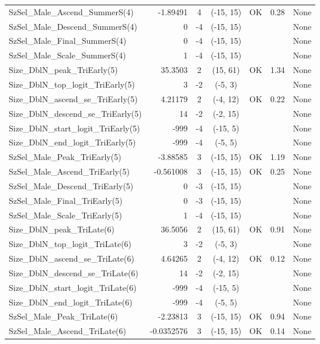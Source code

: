 \documentclass[12pt,]{article}
\begin{document}
\begin{landscape}
\begin{longtable}{lrcccll}
  SzSel\_Male\_Ascend\_SummerS(4) & -1.89491 & 4 & (-15, 15) & OK & 0.28 & None \\ 
  SzSel\_Male\_Descend\_SummerS(4) & 0 & -4 & (-15, 15) &  &  & None \\ 
  SzSel\_Male\_Final\_SummerS(4) & 0 & -4 & (-15, 15) &  &  & None \\ 
  SzSel\_Male\_Scale\_SummerS(4) & 1 & -4 & (-15, 15) &  &  & None \\ 
  Size\_DblN\_peak\_TriEarly(5) & 35.3503 & 2 & (15, 61) & OK & 1.34 & None \\ 
  Size\_DblN\_top\_logit\_TriEarly(5) & 3 & -2 & (-5, 3) &  &  & None \\ 
  Size\_DblN\_ascend\_se\_TriEarly(5) & 4.21179 & 2 & (-4, 12) & OK & 0.22 & None \\ 
  Size\_DblN\_descend\_se\_TriEarly(5) & 14 & -2 & (-2, 15) &  &  & None \\ 
  Size\_DblN\_start\_logit\_TriEarly(5) & -999 & -4 & (-15, 5) &  &  & None \\ 
  Size\_DblN\_end\_logit\_TriEarly(5) & -999 & -4 & (-5, 5) &  &  & None \\ 
  SzSel\_Male\_Peak\_TriEarly(5) & -3.88585 & 3 & (-15, 15) & OK & 1.19 & None \\ 
  SzSel\_Male\_Ascend\_TriEarly(5) & -0.561008 & 3 & (-15, 15) & OK & 0.25 & None \\ 
  SzSel\_Male\_Descend\_TriEarly(5) & 0 & -3 & (-15, 15) &  &  & None \\ 
  SzSel\_Male\_Final\_TriEarly(5) & 0 & -3 & (-15, 15) &  &  & None \\ 
  SzSel\_Male\_Scale\_TriEarly(5) & 1 & -4 & (-15, 15) &  &  & None \\ 
  Size\_DblN\_peak\_TriLate(6) & 36.5056 & 2 & (15, 61) & OK & 0.91 & None \\ 
  Size\_DblN\_top\_logit\_TriLate(6) & 3 & -2 & (-5, 3) &  &  & None \\ 
  Size\_DblN\_ascend\_se\_TriLate(6) & 4.64265 & 2 & (-4, 12) & OK & 0.12 & None \\ 
  Size\_DblN\_descend\_se\_TriLate(6) & 14 & -2 & (-2, 15) &  &  & None \\ 
  Size\_DblN\_start\_logit\_TriLate(6) & -999 & -4 & (-15, 5) &  &  & None \\ 
  Size\_DblN\_end\_logit\_TriLate(6) & -999 & -4 & (-5, 5) &  &  & None \\ 
  SzSel\_Male\_Peak\_TriLate(6) & -2.23813 & 3 & (-15, 15) & OK & 0.94 & None \\ 
  SzSel\_Male\_Ascend\_TriLate(6) & -0.0352576 & 3 & (-15, 15) & OK & 0.14 & None \\ 

\end{longtable}
\end{landscape}
\end{document}
